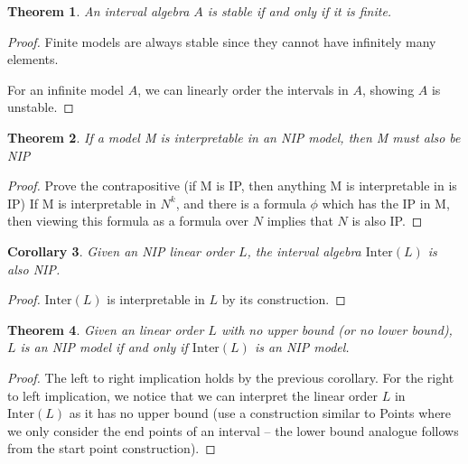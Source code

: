 \documentclass[11pt %
              ]{article}
\newcommand{\inter}[1]{\text{Inter}\left(#1\right)}
\theoremstyle{plain}
\newtheorem{thm}{Theorem}%
\newtheorem{cor}[thm]{Corollary}
\theoremstyle{definition}
\theoremstyle{remark}
\begin{document}

\begin{thm}
  An interval algebra $A$ is stable if and only if it is finite.
\end{thm}
\begin{proof}
  Finite models are always stable since they cannot have infinitely many elements.

  For an infinite model $A$, we can linearly order the intervals in $A$, showing $A$ is unstable.
\end{proof}

\begin{thm}
  If a model M is interpretable in an NIP model, then M must also be NIP
\end{thm}
\begin{proof}
  Prove the contrapositive (if M is IP, then anything M is interpretable in is IP)
  If M is interpretable in $N^k$, and there is a formula $\phi$ which has the IP in M,
  then viewing this formula as a formula over $N$ implies that $N$ is also IP.
\end{proof}

\begin{cor}
  Given an NIP linear order $L$, the interval algebra $\inter{L}$ is also NIP.
\end{cor}
\begin{proof}
  $\inter{L}$ is interpretable in $L$ by its construction.
\end{proof}

\begin{thm}
  Given an linear order $L$ with no upper bound (or no lower bound), $L$ is an NIP model if and only
  if $\inter{L}$ is an NIP model.
\end{thm}
\begin{proof}
  The left to right implication holds by the previous corollary.
  For the right to left implication, we notice that we can interpret the linear order $L$ in
  $\inter{L}$ as it has no upper bound (use a construction similar to Points where we only consider
  the end points of an interval -- the lower bound analogue follows from the start point
  construction).
\end{proof}
\end{document}

